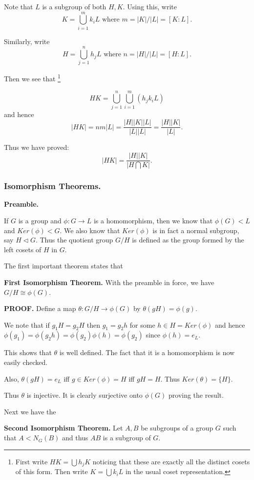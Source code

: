 \documentclass[12pt]{article}
\begin{document}
\begin{enumerate}
Note that $L$ is a subgroup of both $H,K$. Using this, write 
$$K=\bigcup_{i=1}^m k_iL \mbox{ where }  m=|K|/|L| = [K:L].$$

Similarly, write 
$$H=\bigcup_{j=1}^n h_jL \mbox{ where }  n=|H|/|L| = [H:L].$$

Then we see that
\footnote{ First write $HK=\bigcup h_jK$ noticing that these are exactly
all the distinct cosets of this form.
Then write $K = \bigcup k_iL$ in the usual coset representation.}

$$HK = \bigcup_{j=1}^n \bigcup_{i=1}^m\left(  h_jk_iL \right)$$
and hence 
$$|HK|=nm|L| = \frac{|H||K||L|}{|L||L|} = \frac{|H||K|}{|L|}.$$

Thus we have proved:
$$|HK| = \frac{|H||K|}{|H\bigcap K|}.$$

\end{enumerate}

\subsubsection{Isomorphism Theorems.}
{\bf Preamble.}

If $G$ is a group and $\phi:G\rightarrow L$ is a homomorphism, then we
know that $\phi(G)<L$ and $Ker(\phi)<G$. We also know that $Ker(\phi)$ 
is in fact a normal subgroup, say $H\triangleleft G$. Thus the quotient 
group $G/H$ is defined as the group formed by the left cosets of $H$ in
$G$. 

The first important theorem states that 

{\bf First Isomorphism Theorem.}
With the preamble in force, we have $G/H \cong \phi(G)$.

{\bf PROOF.}
Define a map $\theta: G/H \rightarrow \phi(G)$  by $\theta(gH) =
\phi(g)$.

We note that if $g_1H=g_2H$ then $g_1=g_2h$ for some $h\in H=Ker(\phi)$
and hence $\phi(g_1) = \phi(g_2h) = \phi(g_2)\phi(h) = \phi(g_2)$ since 
$\phi(h)=e_L$.

This shows that $\theta$ is well defined. The fact that it is a
homomorphism is now easily checked.

Also, $\theta(gH)=e_L$ iff $g\in Ker(\phi) = H$ iff $gH=H$.
Thus $Ker(\theta) = \{H\}$.

Thus $\theta$ is injective. It is clearly surjective onto
$\phi(G)$ proving the result.

Next we have the

{\bf Second Isomorphism Theorem.}
Let $A,B$ be subgroups of a group $G$ such that 
$A<N_G(B)$ and thus $AB$ is a subgroup of $G$.
\end{document}
